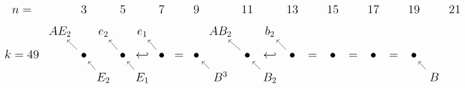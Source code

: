 \documentclass{article}
\begin{document}
\(
\begin{tikzcd}[
nodes={font=\Large},
row sep=0.3cm,
column sep=0.1cm,
column 16/.append style={nodes={align=left,anchor=west}}
]
n= & & 3 & & 5 & & 7 & & 9 & & 11 & & 13 & & 15 & & 17 & & 19 & & 21 & & \\
& AE_2 && e_2 && e_1 && && AB_2 && b_2 \\ 
k=49 && \bullet \arrow[lu] && \bullet \arrow[lu] & \hookleftarrow & \bullet \arrow[lu] & = & \bullet & & \bullet \arrow[lu] & \hookleftarrow & \bullet \arrow[lu] & = & \bullet & = & \bullet & = & \bullet & && \\
& && E_2 \arrow[lu] && E_1 \arrow[lu] && && B^3 \arrow[lu] && B_2 \arrow[lu] && && && && B \arrow[lu] \\
\end{tikzcd}
\)
\end{document}
